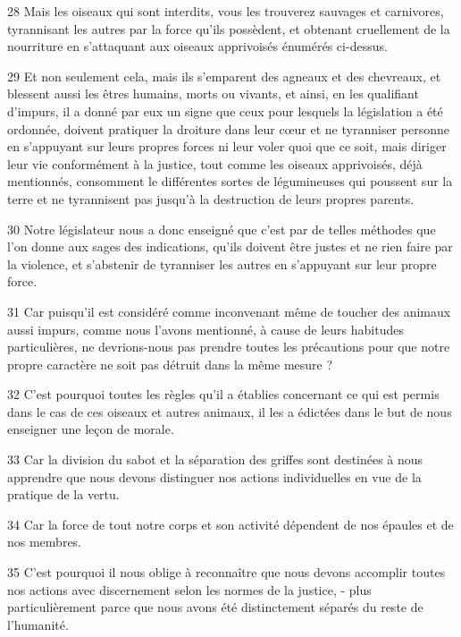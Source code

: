 \par 28 Mais les oiseaux qui sont interdits, vous les trouverez sauvages et carnivores, tyrannisant les autres par la force qu'ils possèdent, et obtenant cruellement de la nourriture en s'attaquant aux oiseaux apprivoisés énumérés ci-dessus.

\par 29 Et non seulement cela, mais ils s'emparent des agneaux et des chevreaux, et blessent aussi les êtres humains, morts ou vivants, et ainsi, en les qualifiant d'impurs, il a donné par eux un signe que ceux pour lesquels la législation a été ordonnée, doivent pratiquer la droiture dans leur cœur et ne tyranniser personne en s'appuyant sur leurs propres forces ni leur voler quoi que ce soit, mais diriger leur vie conformément à la justice, tout comme les oiseaux apprivoisés, déjà mentionnés, consomment le différentes sortes de légumineuses qui poussent sur la terre et ne tyrannisent pas jusqu'à la destruction de leurs propres parents.

\par 30 Notre législateur nous a donc enseigné que c'est par de telles méthodes que l'on donne aux sages des indications, qu'ils doivent être justes et ne rien faire par la violence, et s'abstenir de tyranniser les autres en s'appuyant sur leur propre force.

\par 31 Car puisqu'il est considéré comme inconvenant même de toucher des animaux aussi impurs, comme nous l'avons mentionné, à cause de leurs habitudes particulières, ne devrions-nous pas prendre toutes les précautions pour que notre propre caractère ne soit pas détruit dans la même mesure ?

\par 32 C'est pourquoi toutes les règles qu'il a établies concernant ce qui est permis dans le cas de ces oiseaux et autres animaux, il les a édictées dans le but de nous enseigner une leçon de morale.

\par 33 Car la division du sabot et la séparation des griffes sont destinées à nous apprendre que nous devons distinguer nos actions individuelles en vue de la pratique de la vertu.

\par 34 Car la force de tout notre corps et son activité dépendent de nos épaules et de nos membres.

\par 35 C'est pourquoi il nous oblige à reconnaître que nous devons accomplir toutes nos actions avec discernement selon les normes de la justice, - plus particulièrement parce que nous avons été distinctement séparés du reste de l'humanité.


